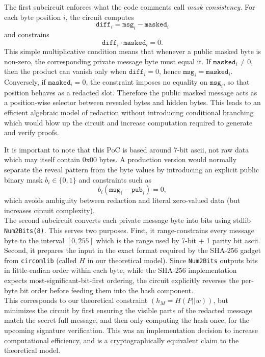 \documentclass[]{article}
\begin{document}
The first subcircuit enforces what the code comments call \emph{mask consistency}. For each byte position $i$, the circuit computes
\[
\texttt{diff}_i = \texttt{msg}_i - \texttt{masked}_i
\]
and constrains
\[
\texttt{diff}_i \cdot \texttt{masked}_i = 0.
\]
This simple multiplicative condition means that whenever a public masked byte is non-zero, the corresponding private message byte must equal it. If $\texttt{masked}_i \neq 0$, then the product can vanish only when $\texttt{diff}_i=0$, hence $\texttt{msg}_i=\texttt{masked}_i$. Conversely, if $\texttt{masked}_i=0$, the constraint imposes no equality on $\texttt{msg}_i$, so that position behaves as a redacted slot. Therefore the public masked message acts as a position-wise selector between revealed bytes and hidden bytes. This leads to an efficient algebraic model of redaction without introducing conditional branching which would blow up the circuit and increase computation required to generate and verify proofs.

It is important to note that this PoC is based around 7-bit ascii, not raw data which may itself contain 0x00 bytes. A production version would normally separate the reveal pattern from the byte values by introducing an explicit public binary mask $b_i \in \{0,1\}$ and constraints such as
\[
b_i(\texttt{msg}_i-\texttt{pub}_i)=0,
\]
which avoids ambiguity between redaction and literal zero-valued data (but increases circuit complexity).\\

The second subcircuit converts each private message byte into bits using stdlib \texttt{Num2Bits(8)}. This serves two purposes. First, it range-constrains every message byte to the interval $[0,255]$ which is the range used by 7-bit + 1 parity bit ascii. Second, it prepares the input in the exact format required by the SHA-256 gadget from \texttt{circomlib} (called $H$ in our theoretical model). Since \texttt{Num2Bits} outputs bits in little-endian order within each byte, while the SHA-256 implementation expects most-significant-bit-first ordering, the circuit explicitly reverses the per-byte bit order before feeding them into the hash component.\\

This corresponds to our theoretical constraint $(h_M=H(P||w))$, but minimizes the circuit by first ensuring the visible parts of the redacted message match the secret full message, and then only computing the hash once, for the upcoming signature verification. This was an implementation decision to increase computational efficiency, and is a cryptographically equivalent claim to the theoretical model.\\
\end{document}

